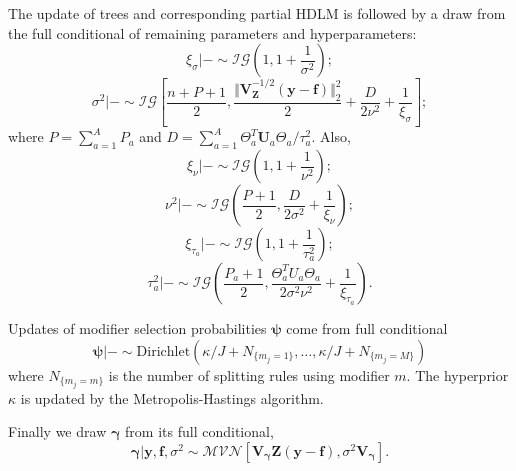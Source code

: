 \documentclass[12pt]{article}
\begin{document}
The update of trees and corresponding partial HDLM is followed by a draw from the full conditional of remaining parameters and hyperparameters:
\begin{equation}
    \xi_{\sigma}|- \sim \mathcal{IG}\left(1,1+\frac{1}{\sigma^2}\right);
\end{equation}
\begin{equation}
    \sigma^2|- \sim \mathcal{IG}\left[\frac{n+P+1}{2}, 
    \frac{\Vert \mathbf{V}_{\mathbf{Z}}^{-1/2} (\mathbf{y}-\mathbf{f}) \Vert_2^2}{2} +\frac{D}{2\nu^2}+\frac{1}{\xi_{\sigma}}\right];
\end{equation}
where $P=\sum_{a=1}^A P_a$ and $D=\sum_{a=1}^A \Theta_a^T\mathbf{U}_a\Theta_a/\tau_a^2$. Also,
\begin{equation}
    \xi_{\nu}|- \sim \mathcal{IG}\left(1,1+\frac{1}{\nu^2}\right);
\end{equation}
\begin{equation}
    \nu^2|- \sim \mathcal{IG}\left(\frac{P+1}{2},
    \frac{D}{2\sigma^2} + \frac{1}{\xi_{\nu}}\right);
\end{equation}
\begin{equation}
    \xi_{\tau_{a}}|- \sim \mathcal{IG}\left(1,1+\frac{1}{\tau_{a}^2}\right);
\end{equation}
\begin{equation}
    \tau_a^2|- \sim \mathcal{IG}\left(\frac{P_a+1}{2}, \frac{\Theta_a^TU_a\Theta_a}{2\sigma^2\nu^2} + \frac{1}{\xi_{\tau_a}}\right).
\end{equation}

Updates of modifier selection probabilities $\boldsymbol\psi$ come from full conditional
\begin{equation}
    \boldsymbol\psi|-\sim\text{Dirichlet}\left(\kappa/J+N_{\{m_j=1\}},\ldots,\kappa/J+N_{\{m_j=M\}}\right)
\end{equation}
where $N_{\{m_j=m\}}$ is the number of splitting rules using modifier $m$. The hyperprior $\kappa$ is updated by the Metropolis-Hastings algorithm.

Finally we draw $\boldsymbol{\gamma}$ from its full conditional,
\begin{equation}
    \boldsymbol{\gamma}|\mathbf{y},\mathbf{f},\sigma^2 \sim \mathcal{MVN}\left[\mathbf{V}_{\boldsymbol{\gamma}}\mathbf{Z}(\mathbf{y}-\mathbf{f}), \sigma^2 \mathbf{V}_{\boldsymbol{\gamma}}\right].
\end{equation}
\end{document}
